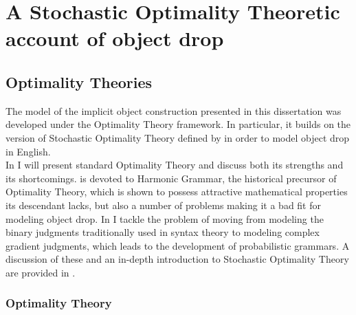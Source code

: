 \setchapterpreamble[u]{\margintoc}
\chapter{A Stochastic Optimality Theoretic account of object drop}


\section{Optimality Theories} 

The model of the implicit object construction presented in this dissertation was developed under the Optimality Theory framework. In particular, it builds on the version of Stochastic Optimality Theory defined by \textcite{Medina2007} in order to model object drop in English.\\
In  I will present standard Optimality Theory and discuss both its strengths and its shortcomings.  is devoted to Harmonic Grammar, the historical precursor of Optimality Theory, which is shown to possess attractive mathematical properties its descendant lacks, but also a number of problems making it a bad fit for modeling object drop. In  I tackle the problem of moving from modeling the binary judgments traditionally used in syntax theory to modeling complex gradient judgments, which leads to the development of probabilistic grammars. A discussion of these and an in-depth introduction to Stochastic Optimality Theory are provided in .

\subsection{Optimality Theory} 

